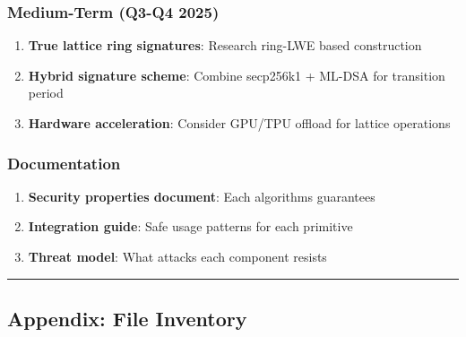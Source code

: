 \documentclass[
]{article}
\providecommand{\tightlist}{%
  \setlength{\itemsep}{0pt}\setlength{\parskip}{0pt}}
\begin{document}
\subsubsection{Medium-Term (Q3-Q4 2025)}\label{medium-term-q3-q4-2025}

\begin{enumerate}
\def\labelenumi{\arabic{enumi}.}
\setcounter{enumi}{6}
\tightlist
\item
  \textbf{True lattice ring signatures}: Research ring-LWE based
  construction
\item
  \textbf{Hybrid signature scheme}: Combine secp256k1 + ML-DSA for
  transition period
\item
  \textbf{Hardware acceleration}: Consider GPU/TPU offload for lattice
  operations
\end{enumerate}

\subsubsection{Documentation}\label{documentation}

\begin{enumerate}
\def\labelenumi{\arabic{enumi}.}
\setcounter{enumi}{9}
\tightlist
\item
  \textbf{Security properties document}: Each
  algorithm\textquotesingle s guarantees
\item
  \textbf{Integration guide}: Safe usage patterns for each primitive
\item
  \textbf{Threat model}: What attacks each component resists
\end{enumerate}

\begin{center}\rule{0.5\linewidth}{0.5pt}\end{center}

\subsection{Appendix: File Inventory}\label{appendix-file-inventory}
\end{document}
